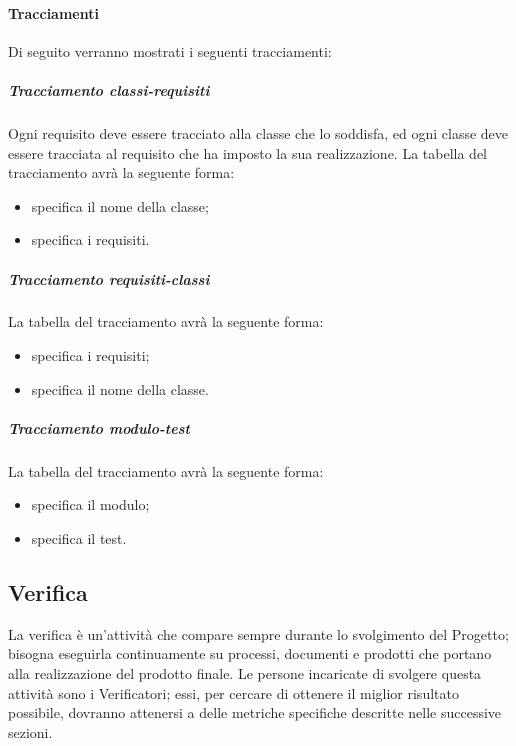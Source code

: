 \paragraph{Tracciamenti}
Di seguito verranno mostrati i seguenti tracciamenti:
\label{}
\subparagraph{Tracciamento classi-requisiti}
Ogni requisito deve essere tracciato alla classe che lo soddisfa, ed ogni classe deve essere tracciata al requisito che ha imposto la sua realizzazione.
La tabella del tracciamento avrà la seguente forma:
\begin{itemize}
\item {}specifica il nome della classe;
\item {}specifica i requisiti.
\end{itemize}
\subparagraph{Tracciamento requisiti-classi}
La tabella del tracciamento avrà la seguente forma:
\begin{itemize}
\item {}specifica i requisiti;
\item {}specifica il nome della classe.
\end{itemize}
\subparagraph{Tracciamento modulo-test}
La tabella del tracciamento avrà la seguente forma:
\begin{itemize}
\item {}specifica il modulo;
\item {}specifica il test.
\end{itemize}


\newpage
\subsection{Verifica}
La verifica è un'attività che compare sempre durante lo svolgimento del Progetto; bisogna eseguirla continuamente su processi, documenti e prodotti che portano alla realizzazione del prodotto finale. Le persone incaricate di svolgere questa attività sono i Verificatori; essi, per cercare di ottenere il miglior risultato possibile, dovranno attenersi a delle metriche specifiche descritte nelle successive sezioni.
\label{11.0}

